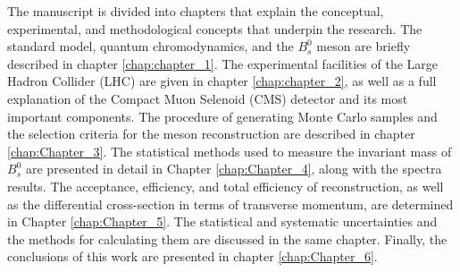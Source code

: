 The manuscript is divided into chapters that explain the conceptual, experimental, and methodological concepts that underpin the research. The standard model, quantum chromodynamics, and the $B^0_s$ meson are briefly described in chapter \ref{chap:chapter_1}. The experimental facilities of the Large Hadron Collider (LHC) are given in chapter \ref{chap:chapter_2}, as well as a full explanation of the Compact Muon Selenoid (CMS) detector and its most important components. The procedure of generating Monte Carlo samples and the selection criteria for the meson reconstruction are described in chapter \ref{chap:Chapter_3}. The statistical methods used to measure the invariant mass of $B^0_s$ are presented in detail in Chapter \ref{chap:Chapter_4}, along with the spectra results. The acceptance, efficiency, and total efficiency of reconstruction, as well as the differential cross-section in terms of transverse momentum, are determined in Chapter \ref{chap:Chapter_5}. The statistical and systematic uncertainties and the methods for calculating them are discussed in the same chapter. Finally, the conclusions of this work are presented in chapter \ref{chap:Chapter_6}. 